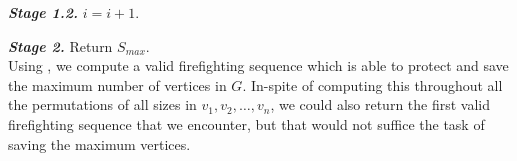 \textbf{\textit{Stage 1.2.}} $i=i+1$.

\textbf{\textit{Stage 2.}} Return $S_{max}$.\\

Using , we compute a valid firefighting sequence which is able to protect and save the maximum number of vertices in $G$. In-spite of computing this throughout all the permutations of all sizes in $v_1,v_2,\dots,v_n$, we could also return the first valid firefighting sequence that we encounter, but that would not suffice the task of saving the maximum vertices.

% 
% 